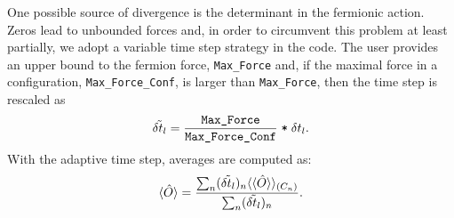 One possible source of divergence is the determinant in the fermionic action. Zeros lead to unbounded forces and, in order to circumvent this problem at least partially, we adopt a variable time step strategy in the code.  The user   provides an upper bound to the fermion force, \texttt{Max\_Force} and, if the maximal force in a configuration, \texttt{Max\_Force\_Conf}, is larger than \texttt{Max\_Force}, then the time step is rescaled as 
\begin{equation}
     \tilde{\delta t_{l}}   =  \frac{ \texttt{Max\_Force}} {\texttt{Max\_Force\_Conf}} \; \texttt{*} \; \delta t_{l}.
\end{equation}
With the adaptive time  step,  averages are computed as: 
\begin{equation}
   \langle \hat{O} \rangle = \frac{ \sum_n (  \tilde{\delta t_{l}}  )_n \langle \langle \hat{O} \rangle   \rangle_{(C_n)}} {\sum_n (  \tilde{\delta t_{l}}  )_n }. 
\end{equation}

